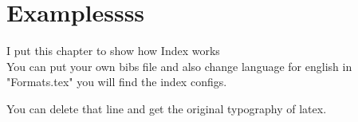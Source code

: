 \section{Examplessss}

I put this chapter to show how Index works\\

You can put your own bibs file and also change language for english in "Formats.tex" you will find the index configs.\\

\lipsum[1-6]





You can delete that line and get the original typography of latex.